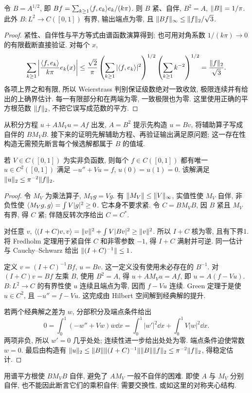 \begin{proposition}\label{prop:greensqrt}
令 $B=A^{1/2}$, 即 $Bf=\sum_{k\ge1}\langle f,e_k\rangle e_k/(k\pi)$. 则 $B$ 紧、自伴, $B^2=A$, $\lVert B\rVert=1/\pi$. 此外 $B:L^2\to C([0,1])$ 有界, 输出端点为零, 且 $\lVert Bf\rVert_\infty\le\lVert f\rVert_2/\sqrt3$.
\end{proposition}
\begin{proof}
紧性、自伴性与平方等式由谱函数演算得到; 也可用对角系数 $1/(k\pi)\to0$ 的有限截断直接验证. 对每个 $x$,
\[
\sum_{k\ge1}\left|\frac{\langle f,e_k\rangle}{k\pi}e_k(x)\right|
\le\frac{\sqrt2}{\pi}\left(\sum_{k\ge1}|\langle f,e_k\rangle|^2\right)^{1/2}
\left(\sum_{k\ge1}k^{-2}\right)^{1/2}
=\frac{\lVert f\rVert_2}{\sqrt3}.
\]
各项上界之和有限, 所以 Weierstrass 判别保证级数绝对一致收敛, 极限连续并有给出的上确界估计. 每一有限部分和在两端为零, 一致极限也为零. 这里使用正确的平方根范数 $\lVert f\rVert_2$, 不把它误写成范数的平方.
\end{proof}

从积分方程 $u+AM_Vu=Af$ 出发, $A=B^2$ 提示先构造 $u=Bv$, 将辅助算子写成自伴的 $BM_VB$. 接下来的证明先解辅助方程、再验证输出满足原问题; 这一存在性构造无需预先断言每个候选解都属于 $B$ 的值域.
\begin{theorem}\label{thm:dirichlet}
若 $V\in C([0,1])$ 为实非负函数, 则每个 $f\in C([0,1])$ 都有唯一 $u\in C^2([0,1])$ 满足 $-u''+Vu=f$, $u(0)=u(1)=0$. 该解满足 $\lVert u\rVert_2\le\pi^{-2}\lVert f\rVert_2$.
\end{theorem}
\begin{proof}
令 $M_V$ 为乘法算子, $M_Vg=Vg$. 有 $\lVert M_V\rVert\le\lVert V\rVert_\infty$, 实值性使 $M_V$ 自伴, 非负性使 $\langle M_Vg,g\rangle=\int V|g|^2\ge0$. 它本身不要求紧. 令 $C=BM_VB$, 因 $B$ 紧且 $M_V$ 有界, 得 $C$ 紧; 伴随反转次序给出 $C=C^*$.

对任意 $v$, $\langle (I+C)v,v\rangle=\lVert v\rVert^2+\int V|Bv|^2\ge\lVert v\rVert^2$. 所以 $I+C$ 核为零, 且有下界1. 将 Fredholm 定理用于紧自伴 $C$ 和非零参数 $-1$, 得 $I+C$ 满射并可逆. 同一估计与 Cauchy--Schwarz 给出 $\lVert (I+C)^{-1}\rVert\le1$.

定义 $v=(I+C)^{-1}Bf$, $u=Bv$. 这一定义没有使用未必存在的 $B^{-1}$. 对 $(I+C)v=Bf$ 左乘 $B$, 使用 $B^2=A$, 得 $u+AM_Vu=Af$, 即 $u=A(f-Vu)$. $B:L^2\to C$ 的有界性使 $u$ 连续且端点为零, 因而 $f-Vu$ 连续. Green 定理于是使 $u\in C^2$, 且 $-u''=f-Vu$. 这完成由 Hilbert 空间解到经典解的提升.

若两个经典解之差为 $w$, 分部积分及端点条件给出
\[
0=\int_0^1(-w''+Vw)\overline w\dd x
=\int_0^1|w'|^2\dd x+\int_0^1V|w|^2\dd x.
\]
两项非负, 所以 $w'=0$ 几乎处处; 连续性进一步给出处处为零. 端点条件迫使常数 $w=0$. 最后由构造有
$\lVert u\rVert_2\le\lVert B\rVert\lVert (I+C)^{-1}\rVert\lVert B\rVert\lVert f\rVert_2\le\pi^{-2}\lVert f\rVert_2$, 得稳定估计.
\end{proof}
用谱平方根使 $BM_VB$ 自伴, 避免了 $AM_V$ 一般不自伴的困难. 即使 $A$ 与 $M_V$ 分别自伴, 也不能因此断言它们的乘积自伴; 需要交换性, 或如这里的对称夹心结构.

